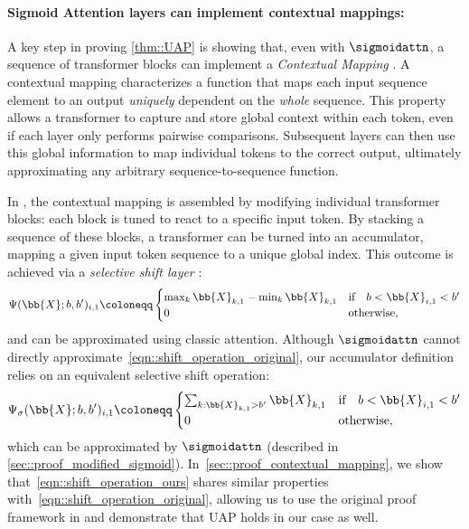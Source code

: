 \paragraph{Sigmoid Attention layers can implement contextual mappings:} A key step in proving \cref{thm::UAP} is showing that, even with $\sigmoidattn$, a sequence of transformer blocks can implement a \emph{Contextual Mapping} \cite[Def.~3.1]{Yun_UAP}. A contextual mapping characterizes a function that maps each input sequence element to an output \emph{uniquely} dependent on the \emph{whole} sequence. This property allows a transformer to capture and store global context within each token, even if each layer only performs pairwise comparisons. Subsequent layers can then use this global information to map individual tokens to the correct output, ultimately approximating any arbitrary sequence-to-sequence function.

In \cite{Yun_UAP}, the contextual mapping is assembled by modifying individual transformer blocks: each block is tuned to react to a specific input token. By stacking a sequence of these blocks, a transformer can be turned into an accumulator, mapping a given input token sequence to a unique global index. This outcome is achieved via a \emph{selective shift layer} \cite[App.~B.5]{Yun_UAP}:
\begin{equation}
    \Psi(\bb{X};b,b')_{i,1}\coloneqq \begin{cases}
        \max_k \bb{X}_{k,1}-\min_k\bb{X}_{k,1}&\text{if}\quad b<\bb{X}_{i,1}<b'\\
        0&\text{otherwise},
    \end{cases}
    \label{eqn::shift_operation_original}
\end{equation}
and can be approximated using classic attention.
Although $\sigmoidattn$ cannot directly approximate~\cref{eqn::shift_operation_original}, our accumulator definition relies on an equivalent selective shift operation:
\begin{equation}
    \Psi_\sigma(\bb{X};b,b')_{i,1}\coloneqq\begin{cases}
        \sum_{k:\bb{X}_{k,1}> b'} \bb{X}_{k,1} &\text{if}\quad b<\bb{X}_{i,1}<b' \\
        0 &\text{otherwise},
    \end{cases}
    \label{eqn::shift_operation_ours}
\end{equation}
which can be approximated by $\sigmoidattn$ (described in \cref{sec::proof_modified_sigmoid}). In~\cref{sec::proof_contextual_mapping}, we show that~\cref{eqn::shift_operation_ours} shares similar properties with~\cref{eqn::shift_operation_original}, allowing us to use the original proof framework in \cite{Yun_UAP} and demonstrate that UAP holds in our case as well.

